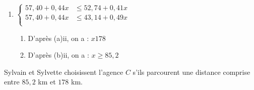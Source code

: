 \begin{enumerate}
\begin{enumerate}
\item  $\begin{cases}
57,40+0,44x &\leqslant 52,74+0,41x\\
57,40+0,44x & \leqslant 43,14+0,49x\\
\end{cases}$  \\

\begin{enumerate}


\item  D'après (a)ii, on a : $x 178$ \\

\item 
 D'après (b)ii, on a : $x\geq 85,2$ \\

\end{enumerate}
\end{enumerate}
\end{enumerate}


Sylvain et Sylvette choisissent l'agence $C$ s'ils parcourent une distance comprise entre $85,2$ km et $178$ km. \\


\ifdefined\COMPLETE
\else
    
\fi